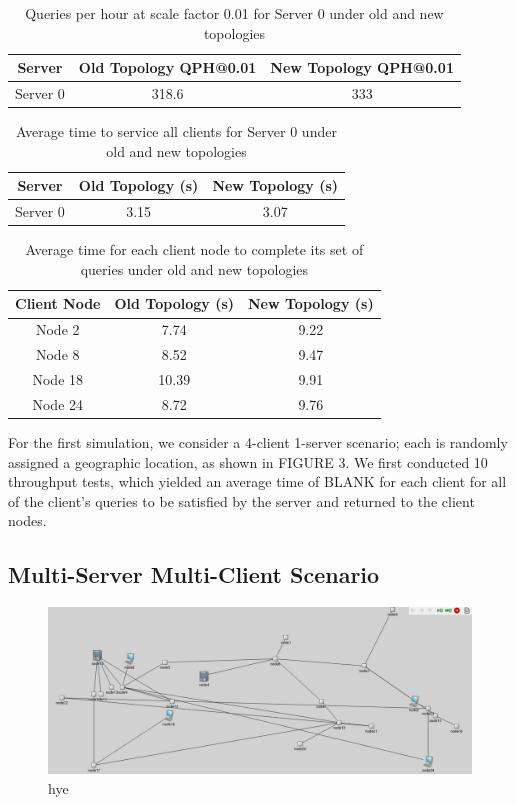 \begin{table}[h!]
\centering
\begin{tabular}{|c|c|c|}
\hline
Server & Old Topology QPH@0.01 & New Topology QPH@0.01 \\ \hline
Server 0 & 318.6 & 333 \\ \hline
\end{tabular}
\caption{Queries per hour at scale factor 0.01 for Server 0 under old and new topologies}
\label{tab:my_label}
\end{table}


\begin{table}[h!]
\centering
\begin{tabular}{|c|c|c|}
\hline
Server & Old Topology (s) & New Topology (s) \\ \hline
Server 0 & 3.15 & 3.07  \\ \hline
\end{tabular}
\caption{Average time to service all clients for Server 0 under old and new topologies}
\label{tab:average_time}
\end{table}

\begin{table}[h!]
\centering
\begin{tabular}{|c|c|c|}
\hline
Client Node & Old Topology (s) & New Topology (s) \\ \hline
Node 2 & 7.74 & 9.22  \\ \hline
Node 8 & 8.52 & 9.47 \\ \hline
Node 18 & 10.39 & 9.91 \\ \hline
Node 24 & 8.72 & 9.76 \\ \hline
\end{tabular}
\caption{Average time for each client node to complete its set of queries under old and new topologies}
\label{tab:avg_time_per_node}
\end{table}


For the first simulation, we consider a 4-client 1-server scenario; each is randomly assigned a geographic location, as shown in FIGURE 3. We first conducted 10 throughput tests, which yielded an average time of BLANK for each client for all of the client's queries to be satisfied by the server and returned to the client nodes. 

\subsection{Multi-Server Multi-Client Scenario}

\begin{figure}[tp]
\centering
\includegraphics[width=0.5 \textwidth]{figures/MultServerOrig}
\caption{hye}
\end{figure}

